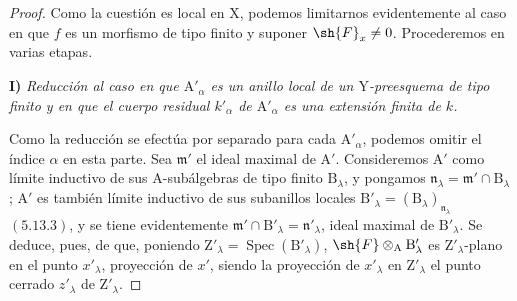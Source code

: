 \begin{proof}
Como la cuestión es local en $\mathrm{X}$, podemos limitarnos evidentemente al caso en que $f$ es
un morfismo de tipo finito y suponer $\sh{F}_x\neq 0$. Procederemos en varias etapas.

\medskip
\noindent\textbf{I)} \emph{Reducción al caso en que $\mathrm{A}'_\alpha$ es un anillo local de un $\mathrm{Y}$-preesquema de tipo finito y en que el
cuerpo residual $k'_\alpha$ de $\mathrm{A}'_\alpha$ es una extensión finita de $k$.}

\medskip
Como la reducción se efectúa por separado para cada $\mathrm{A}'_\alpha$, podemos omitir el índice $\alpha$ en
esta parte. Sea $\mathfrak{m}'$ el ideal maximal de $\mathrm{A}'$. Consideremos $\mathrm{A}'$ como
límite inductivo de sus $\mathrm{A}$-subálgebras de tipo finito $\mathrm{B}_\lambda$, y pongamos $\mathfrak{n}_\lambda=\mathfrak{m}'\cap\mathrm{B}_\lambda$; $\mathrm{A}'$ es también
límite inductivo de sus subanillos locales $\mathrm{B}'_\lambda=(\mathrm{B}_\lambda)_{\mathfrak{n}_\lambda}$ $(5.13.3)$, y se tiene evidentemente
$\mathfrak{m}'\cap\mathrm{B}'_\lambda=\mathfrak{n}'_\lambda$, ideal maximal de $\mathrm{B}'_\lambda$. Se deduce, pues, de  que, poniendo
$\mathrm{Z}'_\lambda=\operatorname{Spec}(\mathrm{B}'_\lambda)$, $\sh{F}\otimes_\mathrm{A}\mathrm{B}'_\lambda$ es $\mathrm{Z}'_\lambda$-plano en el punto $x'_\lambda$, proyección de $x'$, siendo la proyección
de $x'_\lambda$ en $\mathrm{Z}'_\lambda$ el punto cerrado $z'_\lambda$ de $\mathrm{Z}'_\lambda$.


\end{proof}
